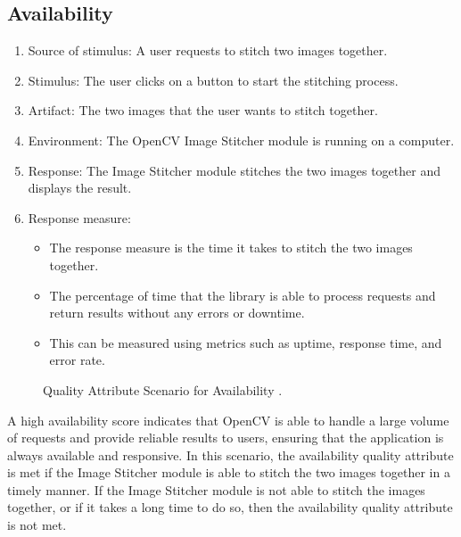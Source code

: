 \subsection{Availability\label{subSection::AvailabilityQA}}
\begin{enumerate}
    \item Source of stimulus: A user requests to stitch two images together.
    \item Stimulus: The user clicks on a button to start the stitching process.
    \item Artifact: The two images that the user wants to stitch together.
    \item Environment: The OpenCV Image Stitcher module is running on a computer.
    \item Response: The Image Stitcher module stitches the two images together and displays the result.
    \item Response measure:
    \begin{itemize}
        \item The response measure is the time it takes to stitch the two images together.
        \item The percentage of time that the library is able to process requests and return results without any errors or downtime.
        \item This can be measured using metrics such as uptime, response time, and error rate.
    \end{itemize}
\end{enumerate}
\begin{figure}[H]
\centering
{}
\caption{\label{Figure::Quality Attribute Scenario for Availability} Quality Attribute Scenario for Availability \cite{drawio}.}
\end{figure}
A high availability score indicates that OpenCV is able to handle a large volume of requests and provide reliable results to users, ensuring that the application is always available and responsive.
In this scenario, the availability quality attribute is met if the Image Stitcher module is able to stitch the two images together in a timely manner. If the Image Stitcher module is not able to stitch the images together, or if it takes a long time to do so, then the availability quality attribute is not met.
